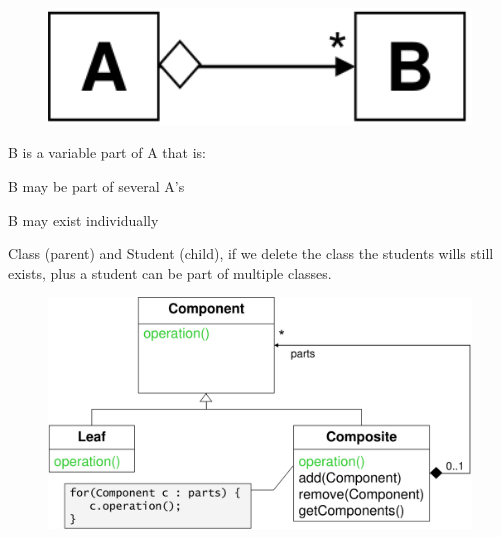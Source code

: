 \begin{defnbox}\nospacing
  \begin{defn}[Aggregate]\label{defn:Aggregate}\leavevmode
    \begin{minipage}[t]{0.45\textwidth}
      \begin{figure}[H]
        \centering
        \includegraphics[width=1.0\textwidth]{figures/aggregate.png}
      \end{figure}
    \end{minipage}
    \begin{minipage}[t]{0.5\textwidth}
    \vspace{-3.5em}
    B is a variable part of A that is:
    \begin{itemizenosep}
        \item B may be part of several A's
        \item B may exist individually
    \end{itemizenosep}
    \end{minipage}
  \end{defn}
\end{defnbox}
\begin{notebox}[Example]\nospacing
    Class (parent) and Student (child), if we delete the class the
    students wills still exists, plus a student can be part of multiple classes.
\end{notebox}
\begin{figure}[H]
  \centering
  \vspace{-1em}
  \includegraphics[width=1.0\columnwidth]{figures/compositePattern.png}
\end{figure}

